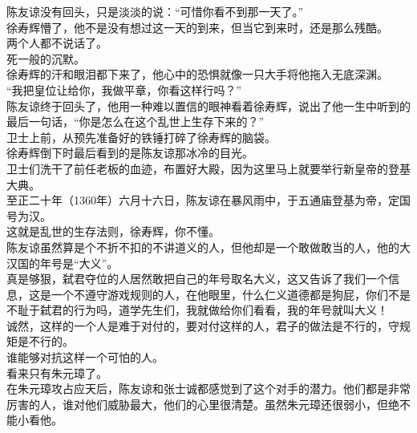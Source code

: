\begin{multicols}{\theparacolNo}
陈友谅没有回头，只是淡淡的说：“可惜你看不到那一天了。”\\

徐寿辉懵了，他不是没有想过这一天的到来，但当它到来时，还是那么残酷。\\

两个人都不说话了。\\

死一般的沉默。\\

徐寿辉的汗和眼泪都下来了，他心中的恐惧就像一只大手将他拖入无底深渊。\\

“我把皇位让给你，我做平章，你看这样行吗？”\\

陈友谅终于回头了，他用一种难以置信的眼神看着徐寿辉，说出了他一生中听到的最后一句话，“你是怎么在这个乱世上生存下来的？”\\

卫士上前，从预先准备好的铁锤打碎了徐寿辉的脑袋。\\

徐寿辉倒下时最后看到的是陈友谅那冰冷的目光。\\

卫士们洗干了前任老板的血迹，布置好大殿，因为这里马上就要举行新皇帝的登基大典。\\

至正二十年（1360年）六月十六日，陈友谅在暴风雨中，于五通庙登基为帝，定国号为汉。\\

这就是乱世的生存法则，徐寿辉，你不懂。\\

陈友谅虽然算是个不折不扣的不讲道义的人，但他却是一个敢做敢当的人，他的大汉国的年号是“大义”。\\

真是够狠，弑君夺位的人居然敢把自己的年号取名大义，这又告诉了我们一个信息，这是一个不遵守游戏规则的人，在他眼里，什么仁义道德都是狗屁，你们不是不耻于弑君的行为吗，道学先生们，我就做给你们看看，我的年号就叫大义！\\

诚然，这样的一个人是难于对付的，要对付这样的人，君子的做法是不行的，守规矩是不行的。\\

谁能够对抗这样一个可怕的人。\\

看来只有朱元璋了。\\

在朱元璋攻占应天后，陈友谅和张士诚都感觉到了这个对手的潜力。他们都是非常厉害的人，谁对他们威胁最大，他们的心里很清楚。虽然朱元璋还很弱小，但绝不能小看他。\\


\end{multicols}
